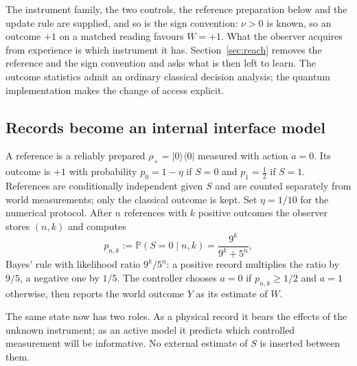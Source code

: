 \documentclass[11pt,a4paper]{article}
\newcommand{\Prb}{\mathbb P}
\begin{document}
The instrument family, the two controls, the reference preparation below and the update rule are supplied, and so is the sign convention: $\nu>0$ is known, so an outcome $+1$ on a matched reading favours $W=+1$. What the observer acquires from experience is which instrument it has. Section~\ref{sec:reach} removes the reference and the sign convention and asks what is then left to learn. The outcome statistics admit an ordinary classical decision analysis; the quantum implementation makes the change of access explicit.

\subsection{Records become an internal interface model}

A reference is a reliably prepared $\rho_+=|0\rangle\langle0|$ measured with action $a=0$. Its outcome is $+1$ with probability $p_0=1-\eta$ if $S=0$ and $p_1=\tfrac12$ if $S=1$. References are conditionally independent given $S$ and are counted separately from world measurements; only the classical outcome is kept. Set $\eta=1/10$ for the numerical protocol. After $n$ references with $k$ positive outcomes the observer stores $(n,k)$ and computes
\begin{equation}\label{eq:posterior}
 p_{n,k}:=\Prb(S=0\mid n,k)=\frac{9^k}{9^k+5^n},
\end{equation}
Bayes' rule with likelihood ratio $9^k/5^n$: a positive record multiplies the ratio by $9/5$, a negative one by $1/5$. The controller chooses $a=0$ if $p_{n,k}\ge1/2$ and $a=1$ otherwise, then reports the world outcome $Y$ as its estimate of $W$.

The same state now has two roles. As a physical record it bears the effects of the unknown instrument; as an active model it predicts which controlled measurement will be informative. No external estimate of $S$ is inserted between them.
\end{document}
